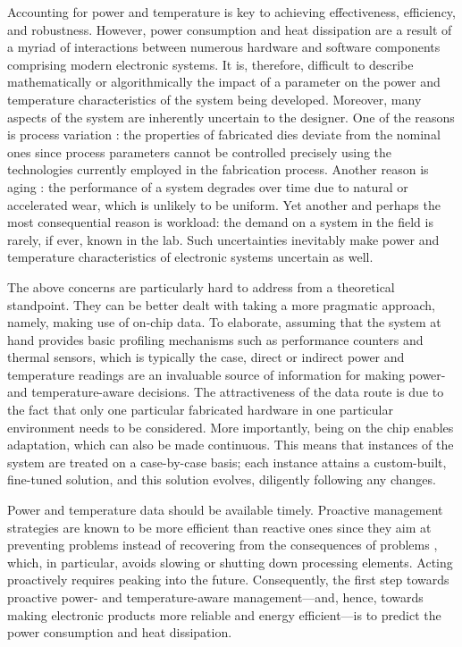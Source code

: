 Accounting for power and temperature is key to achieving effectiveness,
efficiency, and robustness. However, power consumption and heat dissipation are
a result of a myriad of interactions between numerous hardware and software
components comprising modern electronic systems. It is, therefore, difficult to
describe mathematically or algorithmically the impact of a parameter on the
power and temperature characteristics of the system being developed. Moreover,
many aspects of the system are inherently uncertain to the designer. One of the
reasons is process variation \cite{chandrakasan2000}: the properties of
fabricated dies deviate from the nominal ones since process parameters cannot be
controlled precisely using the technologies currently employed in the
fabrication process. Another reason is aging \cite{coskun2006}: the performance
of a system degrades over time due to natural or accelerated wear, which is
unlikely to be uniform. Yet another and perhaps the most consequential reason is
workload: the demand on a system in the field is rarely, if ever, known in the
lab. Such uncertainties inevitably make power and temperature characteristics of
electronic systems uncertain as well.

The above concerns are particularly hard to address from a theoretical
standpoint. They can be better dealt with taking a more pragmatic approach,
namely, making use of on-chip data. To elaborate, assuming that the system at
hand provides basic profiling mechanisms such as performance counters and
thermal sensors, which is typically the case, direct or indirect power and
temperature readings are an invaluable source of information for making power-
and temperature-aware decisions. The attractiveness of the data route is due to
the fact that only one particular fabricated hardware in one particular
environment needs to be considered. More importantly, being on the chip enables
adaptation, which can also be made continuous. This means that instances of the
system are treated on a case-by-case basis; each instance attains a
custom-built, fine-tuned solution, and this solution evolves, diligently
following any changes.


Power and temperature data should be available timely. Proactive management
strategies are known to be more efficient than reactive ones since they aim at
preventing problems instead of recovering from the consequences of problems
\cite{coskun2008, chaudhry2015}, which, in particular, avoids slowing or
shutting down processing elements. Acting proactively requires peaking into the
future. Consequently, the first step towards proactive power- and
temperature-aware management---and, hence, towards making electronic products
more reliable and energy efficient---is to predict the power consumption and
heat dissipation.

